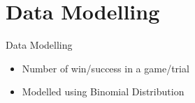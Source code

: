 \section{Data Modelling}

\begin{frame}{Data Modelling}

  \begin{itemize}
    \item Number of win/success in a game/trial
    \item Modelled using Binomial Distribution
  \end{itemize}
  
\end{frame}






  






